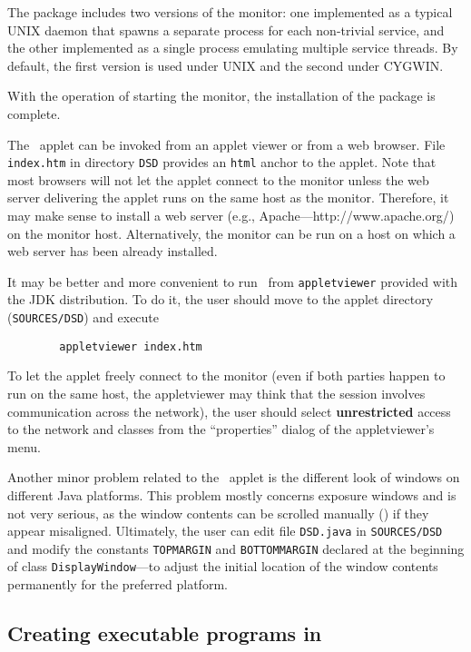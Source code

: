The package includes two versions of the monitor: one implemented as a
typical UNIX daemon that spawns a separate process for each non-trivial
service, and the other implemented as a single process emulating multiple
service threads.
By default, the first version is used under UNIX and the second under
CYGWIN.

With the operation of starting the monitor, the installation of the package
is complete.

The \dsd\ applet can be invoked from an applet viewer or from a web browser.
File {\tt index.htm}
in directory {\tt DSD} provides an {\tt html} anchor to the applet.
Note that most browsers will not let the applet connect to the monitor
unless the web server delivering the applet runs on the same host as the
monitor.
Therefore, it may make sense to install a web server
(e.g.,
Apache---{http://www.apache.org/})
on the monitor host.
Alternatively, the monitor can be run on a host on which a web server has been
already installed.

It may be better and more convenient to run \dsd\ from {\tt appletviewer}
provided with the JDK distribution.
To do it, the user should move to the applet directory ({\tt SOURCES/DSD})
and execute
\begin{verbatim}
        appletviewer index.htm
\end{verbatim}

To let the applet freely connect to the monitor (even if both parties
happen to run
on the same host, the appletviewer may think that the session involves
communication across the network), the user should select {\bf unrestricted}
access to the network and classes from the ``properties'' dialog of the
appletviewer's menu.

Another minor problem related to the \dsd\ applet is the different look
of windows on different Java platforms.
This problem mostly concerns exposure windows and is not very serious,
as the window contents can be scrolled manually () if
they appear misaligned.
Ultimately,
the user can edit file {\tt DSD.java} in {\tt SOURCES/DSD} and modify the
constants {\tt TOPMARGIN} and {\tt BOTTOMMARGIN} declared at the
beginning of class {\tt DisplayWindow}---to adjust the initial location
of the window contents permanently for the preferred platform.

\subsection{Creating executable programs in \smurph}
\label{rm_un_cr}

